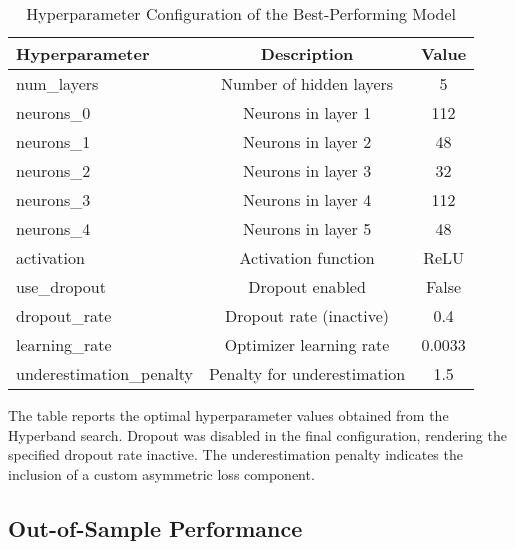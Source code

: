 \begin{table}[H]
	\centering
	\begin{threeparttable}
		\caption{Hyperparameter Configuration of the Best-Performing Model}
		\label{tab:best_hyperparameters}
		\begin{tabular}{lcc}
			\toprule
			\textbf{Hyperparameter}  & \textbf{Description}        & \textbf{Value} \\
			\midrule
			num\_layers              & Number of hidden layers     & 5              \\
			neurons\_0               & Neurons in layer 1          & 112            \\
			neurons\_1               & Neurons in layer 2          & 48             \\
			neurons\_2               & Neurons in layer 3          & 32             \\
			neurons\_3               & Neurons in layer 4          & 112            \\
			neurons\_4               & Neurons in layer 5          & 48             \\
			activation               & Activation function         & ReLU           \\
			use\_dropout             & Dropout enabled             & False          \\
			dropout\_rate            & Dropout rate (inactive)     & 0.4            \\
			learning\_rate           & Optimizer learning rate     & 0.0033         \\
			underestimation\_penalty & Penalty for underestimation & 1.5            \\
			\bottomrule
		\end{tabular}
		\begin{tablenotes}
			\footnotesize
			\item The table reports the optimal hyperparameter values obtained from the Hyperband search. Dropout was disabled in the final configuration, rendering the specified dropout rate inactive. The underestimation penalty indicates the inclusion of a custom asymmetric loss component.
		\end{tablenotes}
	\end{threeparttable}
\end{table}

\subsection{Out-of-Sample Performance}
